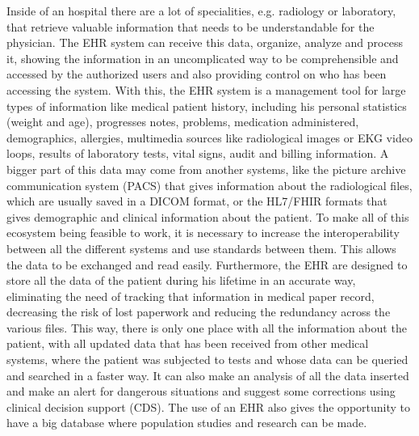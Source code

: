 \documentclass[mim_thesis.tex]{subfiles}
\begin{document}
Inside of an hospital there are a lot of specialities, e.g. radiology or laboratory, that retrieve valuable information that needs to be understandable for the physician. The EHR system can receive this data, organize, analyze and process it, showing the information in an uncomplicated way to be comprehensible and accessed by the authorized users and also providing control on who has been accessing the system. With this, the EHR system is a management tool for large types of information like medical patient history, including his personal statistics (weight and age), progresses notes, problems, medication administered, demographics, allergies, multimedia sources like radiological images or EKG video loops, results of laboratory tests, vital signs, audit and billing information. A bigger part of this data may come from another systems, like the picture archive communication system (PACS) that gives information about the radiological files, which are usually saved in a DICOM format, or the HL7/FHIR formats that gives demographic and clinical information about the patient. To make all of this ecosystem being feasible to work, it is necessary to increase the interoperability between all the different systems and use standards between them. This allows the data to be exchanged and read easily. 
Furthermore, the EHR are designed to store all the data of the patient during his lifetime in an accurate way, eliminating the need of tracking that information in medical paper record, decreasing the risk of lost paperwork and reducing the redundancy across the various files. This way, there is only one place with all the information about the patient, with all updated data that has been received from other medical systems, where the patient was subjected to tests and whose data can be queried and searched in a faster way. It can also make an analysis of all the data inserted and make an alert for dangerous situations and suggest some corrections using clinical decision support (CDS). The use of an EHR also gives the opportunity to have a big database where population studies and research can be made. \\
\end{document}
